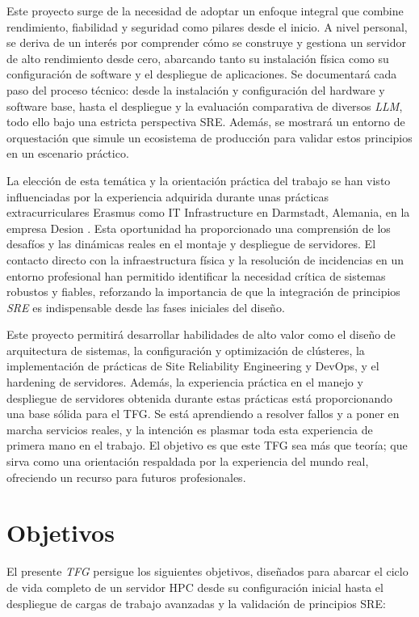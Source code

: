 Este proyecto surge de la necesidad de adoptar un enfoque integral que combine rendimiento, fiabilidad y seguridad como pilares desde el inicio. A nivel personal, se deriva de un interés por comprender cómo se construye y gestiona un servidor de alto rendimiento desde cero, abarcando tanto su instalación física como su configuración de software y el despliegue de aplicaciones. Se documentará cada paso del proceso técnico: desde la instalación y configuración del hardware y software base, hasta el despliegue y la evaluación comparativa de diversos \textit{LLM}, todo ello bajo una estricta perspectiva SRE. Además, se mostrará un entorno de orquestación que simule un ecosistema de producción para validar estos principios en un escenario práctico.

La elección de esta temática y la orientación práctica del trabajo se han visto influenciadas por la experiencia adquirida durante unas prácticas extracurriculares Erasmus como IT Infrastructure en Darmstadt, Alemania, en la empresa Desion \cite{ref38}. Esta oportunidad ha proporcionado una comprensión de los desafíos y las dinámicas reales en el montaje y despliegue de servidores. El contacto directo con la infraestructura física y la resolución de incidencias en un entorno profesional han permitido identificar la necesidad crítica de sistemas robustos y fiables, reforzando la importancia de que la integración de principios \textit{SRE} es indispensable desde las fases iniciales del diseño.

Este proyecto permitirá desarrollar habilidades de alto valor como el diseño de arquitectura de sistemas, la configuración y optimización de clústeres, la implementación de prácticas de Site Reliability Engineering y DevOps, y el hardening de servidores. Además, la experiencia práctica en el manejo y despliegue de servidores obtenida durante estas prácticas está proporcionando una base sólida para el TFG. Se está aprendiendo a resolver fallos y a poner en marcha servicios reales, y la intención es plasmar toda esta experiencia de primera mano en el trabajo. El objetivo es que este TFG sea más que teoría; que sirva como una orientación respaldada por la experiencia del mundo real, ofreciendo un recurso para futuros profesionales.

\section{Objetivos}
El presente \textit{TFG} persigue los siguientes objetivos, diseñados para abarcar el ciclo de vida completo de un servidor HPC desde su configuración inicial hasta el despliegue de cargas de trabajo avanzadas y la validación de principios SRE:

